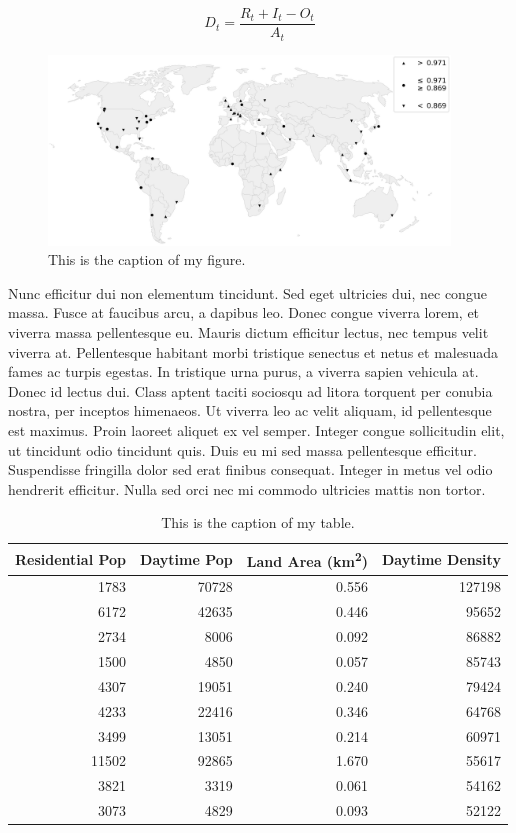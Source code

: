 \documentclass[11pt,twocolumn]{article}
\begin{document}
\begin{equation}
	\label{eq:my_equation}
	D_t = \frac{R_t + I_t - O_t}{A_t}
\end{equation}

\begin{figure}[htbp]
	\centering
	\includegraphics[width=0.95\textwidth]{example.png}
	\caption{This is the caption of my figure.}
	\label{fig:my_figure}
\end{figure}

Nunc efficitur dui non elementum tincidunt. Sed eget ultricies dui, nec congue massa. Fusce at faucibus arcu, a dapibus leo. Donec congue viverra lorem, et viverra massa pellentesque eu. Mauris dictum efficitur lectus, nec tempus velit viverra at. Pellentesque habitant morbi tristique senectus et netus et malesuada fames ac turpis egestas. In tristique urna purus, a viverra sapien vehicula at. Donec id lectus dui. Class aptent taciti sociosqu ad litora torquent per conubia nostra, per inceptos himenaeos. Ut viverra leo ac velit aliquam, id pellentesque est maximus. Proin laoreet aliquet ex vel semper. Integer congue sollicitudin elit, ut tincidunt odio tincidunt quis. Duis eu mi sed massa pellentesque efficitur. Suspendisse fringilla dolor sed erat finibus consequat. Integer in metus vel odio hendrerit efficitur. Nulla sed orci nec mi commodo ultricies mattis non tortor.

\begin{table}[tbp]
	\centering
	\caption{This is the caption of my table.}
	\label{tab:my_table}
	\begin{tabular}{rrrr}
		\toprule
		Residential Pop &  Daytime Pop &  Land Area (km\textsuperscript{2}) &  Daytime Density \\
		\midrule
		1783  & 70728 & 0.556 & 127198 \\
		6172  & 42635 & 0.446 &  95652 \\
		2734  &  8006 & 0.092 &  86882 \\
		1500  &  4850 & 0.057 &  85743 \\
		4307  & 19051 & 0.240 &  79424 \\
		4233  & 22416 & 0.346 &  64768 \\
		3499  & 13051 & 0.214 &  60971 \\
		11502 & 92865 & 1.670 &  55617 \\
		3821  &  3319 & 0.061 &  54162 \\
		3073  &  4829 & 0.093 &  52122 \\
		\bottomrule
	\end{tabular}
\end{table}
\end{document}
